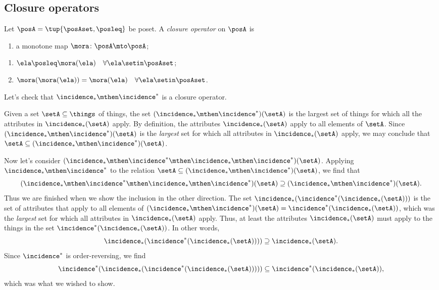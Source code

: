 {\subsection{Closure operators}

\begin{definition}
Let $\posA = \tup{\posAset, \posleq}$ be poset. A \emph{closure operator} on $\posA$ is

\constit
\begin{enumerate}
\item a monotone map $\mora \colon \posA \mto \posA$; 
\end{enumerate}

\condit
\begin{enumerate}
\item $\ela \posleq \mora(\ela) \quad \forall \ela \setin \posAset$;
\item  $\mora (\mora(\ela)) =  \mora(\ela) \quad \forall \ela \setin \posAset$. 
\end{enumerate}

\end{definition}

Let's check that $\incidence_* \mthen \incidence^*$ is a closure operator. 


Given a set $\setA \subseteq \things$ of things, the set $(\incidence_* \mthen \incidence^*)(\setA)$ is the largest set of things for which all the attributes in $\incidence_*(\setA)$ apply. By definition, the attributes $\incidence_*(\setA)$ apply to all elements of $\setA$. Since $(\incidence_* \mthen \incidence^*)(\setA)$ is the \emph{largest} set for which all attributes in $\incidence_*(\setA)$ apply, we may conclude that $\setA \subseteq (\incidence_* \mthen \incidence^*)(\setA)$. 

Now let's consider $(\incidence_* \mthen \incidence^* \mthen \incidence_* \mthen \incidence^*)(\setA)$. Applying $\incidence_* \mthen \incidence^*$ to the relation $\setA \subseteq (\incidence_* \mthen \incidence^*)(\setA)$, we find that 
\begin{equation}
(\incidence_* \mthen \incidence^* \mthen \incidence_* \mthen \incidence^*)(\setA) \supseteq (\incidence_* \mthen \incidence^*)(\setA). 
\end{equation}
Thus we are finished when we show the inclusion in the other direction. The set $\incidence_*(\incidence^* (\incidence_* (\setA)))$ is the set of attributes that apply to all elements of $(\incidence_* \mthen \incidence^*)(\setA) = \incidence^* (\incidence_* (\setA))$, which was the \emph{largest} set for which all attributes in $\incidence_*(\setA)$ apply. Thus, at least the attributes $\incidence_*(\setA)$ must apply to the things in the set $\incidence^* (\incidence_* (\setA))$. In other words, 
\begin{equation}
\incidence_*(\incidence^* (\incidence_* (\setA)))) \supseteq \incidence_* (\setA).
\end{equation}
Since $\incidence^*$ is order-reversing, we find 
\begin{equation}
\incidence^*(\incidence_*(\incidence^* (\incidence_* (\setA))))) \subseteq \incidence^*(\incidence_* (\setA)),
\end{equation}
which was what we wished to show. 


}
